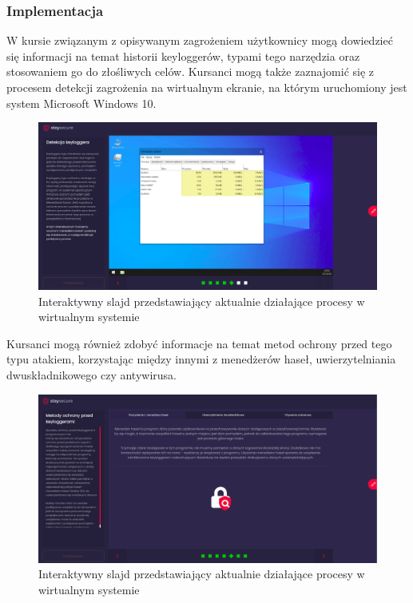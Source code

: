 \documentclass[12pt,twoside]{article}
\begin{document}
\subsubsection{Implementacja}

W kursie związanym z opisywanym zagrożeniem użytkownicy mogą dowiedzieć się informacji na temat historii keyloggerów, typami tego narzędzia oraz stosowaniem go do złośliwych celów. Kursanci mogą także zaznajomić się z procesem detekcji zagrożenia na wirtualnym ekranie, na którym uruchomiony jest system Microsoft Windows 10. 

\begin{figure}[H]
	\centering
	\includegraphics[width=1\linewidth]{figures/keylogger-slide-screenshot1}
	\caption{Interaktywny slajd przedstawiający aktualnie działające procesy w wirtualnym systemie}
\end{figure}

Kursanci mogą również zdobyć informacje na temat metod ochrony przed tego typu atakiem, korzystając między innymi z menedżerów haseł, uwierzytelniania dwuskładnikowego czy antywirusa.

\begin{figure}[H]
	\centering
	\includegraphics[width=1\linewidth]{figures/keylogger-slide-screenshot2}
	\caption{Interaktywny slajd przedstawiający aktualnie działające procesy w wirtualnym systemie}
\end{figure}
\end{document}
